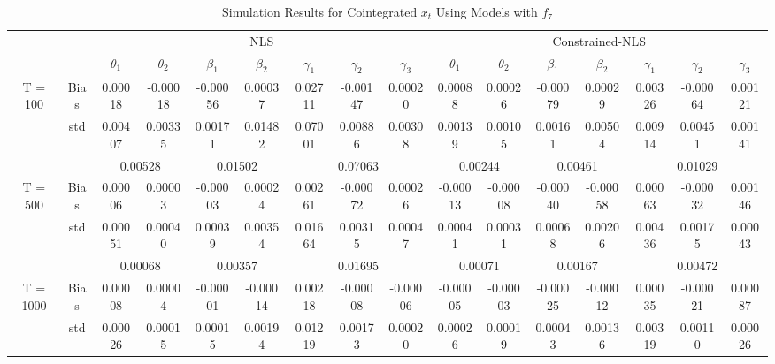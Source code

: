 \documentclass[a4paper,12pt,times,numbered,print,index]{report}
\numberwithin{equation}{section}
\begin{document}
\begin{table}[htbp]
  \centering
  \caption{Simulation Results for Cointegrated $x_t$ Using Models with $f_7$}
    \begin{adjustbox}{max width=\textwidth}
    \begin{tabular}{cccccccccccccccc}
    \toprule
          &       & \multicolumn{7}{c}{NLS}                               & \multicolumn{7}{c}{Constrained-NLS} \\
          &       & $\theta_1$ & $\theta_2$ & $\beta_1$ & $\beta_2$ & $\gamma_1$ & $\gamma_2$ & $\gamma_3$ & $\theta_1$ & $\theta_2$ & $\beta_1$ & $\beta_2$ & $\gamma_1$ & $\gamma_2$ & $\gamma_3$ \\
    \midrule
    \multirow{3}[1]{*}{T = 100} & Bias  & 0.00018 & -0.00018 & \textcolor[rgb]{ 0,  .439,  .753}{-0.00056} & 0.00037 & 0.02711 & -0.00147 & 0.00020 & 0.00088 & 0.00026 & \textcolor[rgb]{ 0,  .439,  .753}{-0.00079} & 0.00029 & 0.00326 & -0.00064 & 0.00121 \\
          & std   & 0.00407 & 0.00335 & 0.00171 & 0.01482 & 0.07001 & 0.00886 & 0.00308 & 0.00139 & 0.00105 & 0.00161 & 0.00504 & 0.00914 & 0.00451 & 0.00141 \\
          &       & \multicolumn{2}{c}{0.00528} & \multicolumn{2}{c}{0.01502} & \multicolumn{3}{c}{0.07063} & \multicolumn{2}{c}{0.00244} & \multicolumn{2}{c}{0.00461} & \multicolumn{3}{c}{0.01029} \\
    \multirow{3}[0]{*}{T = 500} & Bias  & 0.00006 & 0.00003 & \textcolor[rgb]{ 0,  .439,  .753}{-0.00003} & 0.00024 & 0.00261 & -0.00072 & 0.00026 & -0.00013 & -0.00008 & \textcolor[rgb]{ 0,  .439,  .753}{-0.00040} & -0.00058 & 0.00063 & -0.00032 & 0.00146 \\
          & std   & 0.00051 & 0.00040 & 0.00039 & 0.00354 & 0.01664 & 0.00315 & 0.00047 & 0.00041 & 0.00031 & 0.00068 & 0.00206 & 0.00436 & 0.00175 & 0.00043 \\
          &       & \multicolumn{2}{c}{0.00068} & \multicolumn{2}{c}{0.00357} & \multicolumn{3}{c}{0.01695} & \multicolumn{2}{c}{0.00071} & \multicolumn{2}{c}{0.00167} & \multicolumn{3}{c}{0.00472} \\
    \multirow{3}[1]{*}{T = 1000} & Bias  & 0.00008 & 0.00004 & \textcolor[rgb]{ 0,  .439,  .753}{-0.00001} & -0.00014 & 0.00218 & -0.00008 & -0.00006 & -0.00005 & -0.00003 & \textcolor[rgb]{ 0,  .439,  .753}{-0.00025} & -0.00012 & 0.00035 & -0.00021 & 0.00087 \\
          & std   & 0.00026 & 0.00015 & 0.00015 & 0.00194 & 0.01219 & 0.00173 & 0.00020 & 0.00026 & 0.00019 & 0.00043 & 0.00136 & 0.00319 & 0.00110 & 0.00026 \\

\end{tabular}
\end{adjustbox}
\end{table}
\end{document}
